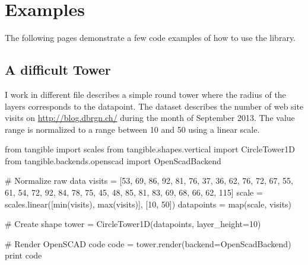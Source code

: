 
\chapter{Examples}

\label{ch:examples}

The following pages demonstrate a few code examples of how to use the
\tangible{} library.


\section{A difficult Tower}\label{sec:tower}

I work in different file describes a simple round tower where the radius of the layers
corresponds to the datapoint. The dataset describes the number of web site
visits on \url{http://blog.dbrgn.ch/} during the month of September 2013. The
value range is normalized to a range between 10 and 50 using a linear scale.

\vspace{.5\baselineskip}
\begin{pythoncode}
from tangible import scales
from tangible.shapes.vertical import CircleTower1D
from tangible.backends.openscad import OpenScadBackend

# Normalize raw data
visits = [53, 69, 86, 92, 81, 76, 37, 36, 62, 76, 72, 67, 55, 61, 54,
          72, 92, 84, 78, 75, 45, 48, 85, 81, 83, 69, 68, 66, 62, 115]
scale = scales.linear([min(visits), max(visits)], [10, 50])
datapoints = map(scale, visits)

# Create shape
tower = CircleTower1D(datapoints, layer_height=10)

# Render OpenSCAD code
code = tower.render(backend=OpenScadBackend)
print code
\end{pythoncode}
\vspace{.5\baselineskip}

